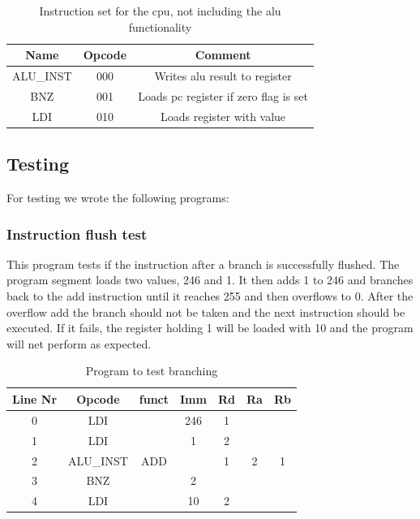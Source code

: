 \documentclass[11pt]{report}
\begin{document}
\begin{table}[h]
  \centering
  \begin{tabular}{|c|c|c|}
    \hline
    Name&Opcode&Comment \\
    \hline
    ALU\_INST&000&Writes alu result to register\\
    BNZ&001&Loads pc register if zero flag is set\\
    LDI&010&Loads register with value\\
    \hline
  \end{tabular}
  \caption{Instruction set for the cpu, not including the alu functionality}
\end{table}

\subsection*{Testing}

For testing we wrote the following programs:

\subsubsection*{Instruction flush test}

This program tests if the instruction after a branch is successfully flushed.
The program segment loads two values, 246 and 1. It then adds 1 to 246 and
branches back to the add instruction until it reaches 255 and then overflows
to 0. After the overflow add the branch should not be taken and the next instruction
should be executed. If it fails, the register holding 1 will be loaded with 10
and the program will net perform as expected.

\begin{table}[h]
  \centering
  \begin{tabular}{|c|c|c|c|c|c|c|}
    \hline
    Line Nr &	Opcode		&	funct	&	Imm	&	Rd	&	Ra	&	Rb	\\\hline
    	0	&	LDI			&			&	246	&	1	&		&		\\\hline
    	1	&	LDI			&			&	1	&	2	&		&		\\\hline
    	2	&	ALU\_INST	&	ADD		&		&	1	&	2	&	1	\\\hline
    	3	&	BNZ			&			&	2	&		&		&		\\\hline
    	4	&	LDI			&			&	10	&	2	&		&		\\\hline
  \end{tabular}
  \caption{Program to test branching}
\end{table}
\end{document}
